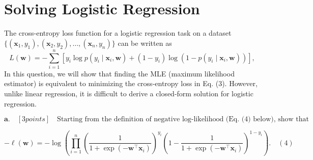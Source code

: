 \documentclass[a3paper,12pt]{extarticle} %
\begin{document}
\newpage
\section{Solving Logistic Regression}
The cross-entropy loss function for a logistic regression task on a dataset \( \{(\mathbf{x}_1, y_1), (\mathbf{x}_2, y_2), \dots, (\mathbf{x}_n, y_n)\} \) can be written as
\[
L(\mathbf{w}) = -\sum_{i=1}^n \left[ y_i \log p(y_i \mid \mathbf{x}_i, \mathbf{w}) + (1 - y_i) \log (1 - p(y_i \mid \mathbf{x}_i, \mathbf{w})) \right],
\]
In this question, we will show that finding the MLE (maximum likelihood estimator) is equivalent to minimizing the cross-entropy loss in Eq. (3). However, unlike linear regression, it is difficult to derive a closed-form solution for logistic regression.

\[
\textbf{a.} \quad [3 points] \quad \text{Starting from the definition of negative log-likelihood (Eq. (4) below), show that it is equal to the cross-entropy loss (Eq. (3)).}
\]

\[
-\ell(\mathbf{w}) = -\log \left( \prod_{i=1}^n \left( \frac{1}{1 + \exp(-\mathbf{w}^\top \mathbf{x}_i)} \right)^{y_i} \left( 1 - \frac{1}{1 + \exp(-\mathbf{w}^\top \mathbf{x}_i)} \right)^{1 - y_i} \right). \quad (4)
\]

\end{document}
